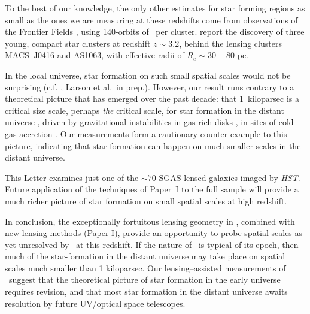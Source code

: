To the best of our knowledge, the only other estimates for star
forming regions as small as the ones we are measuring at these
redshifts come from observations of the Frontier Fields \citep{Lotz:2017gd}, 
using 140-orbits of \hst\ per cluster.
\citet{Vanzella:2017wd,Vanzella:2017ea} report the discovery of three young, compact star clusters
at redshift $z\sim3.2$, behind the lensing clusters MACS~J0416 and AS1063, 
with effective radii of $R_e \sim30-80$ pc.

In the local universe, star formation on such small spatial scales
would not be surprising (c.f. \citealt{Liu:2013qy},  Larson et al.\ in prep.). 
However, our result runs contrary to a theoretical picture that has emerged over the past decade: 
that 1~kiloparsec is a critical size scale, perhaps {\it the} critical scale, for 
star formation in the distant universe 
\citep{Elmegreen:2005xy, Elmegreen:2007qv, Elmegreen:2009nr, Forster-Schreiber:2011sf, 
Guo:2011rm, Guo:2015zl}, driven by gravitational instabilities in gas-rich disks 
\citep{Toomre:1964fr, Noguchi:1999vf, Genzel:2011ys},
in sites of cold gas accretion \citep{Keres:2005yq, Dekel:2006qf, Brooks:2009jk}.
Our measurements form a cautionary counter-example to this picture,
indicating that star formation can happen on much smaller scales in the distant universe.

This Letter examines just one of the $\sim70$ SGAS lensed galaxies 
imaged by \textit{HST}.  Future application of the techniques of Paper~I to the full sample 
will provide a much richer picture of star formation on small spatial scales at high redshift.

In conclusion, the exceptionally fortuitous lensing geometry in \arcname,
combined with new lensing methods (Paper I), 
provide an opportunity to probe spatial scales as yet
unresolved by \hst\ at this redshift.
If the nature of \arcname\ is typical of its epoch,
then much of the star-formation in the distant universe may 
take place on spatial scales much smaller than 1 kiloparsec. 
Our lensing--assisted measurements of \arcname\ 
suggest that the theoretical picture of star formation in the early universe 
requires revision,  and that most star formation in the distant universe awaits 
resolution by  future UV/optical space telescopes.
 
\vspace{24pt}

